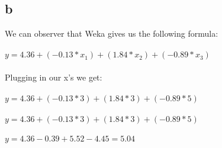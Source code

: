 \documentclass{article}
\begin{document}
\subsection*{b}
We can observer that Weka gives us the following formula:\\\\
$y = 4.36 + (-0.13*x_{1}) + (1.84*x_{2}) + (-0.89*x_{3})$\\\\
Plugging in our x's we get:\\\\
$y = 4.36 + (-0.13*3) + (1.84*3) + (-0.89*5)$\\\\
$y = 4.36 + (-0.13*3) + (1.84*3) + (-0.89*5)$\\\\
$y = 4.36 - 0.39 + 5.52 - 4.45 = 5.04$\\\\
\end{document}
